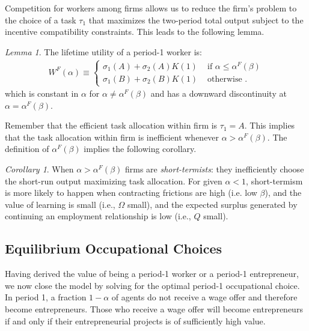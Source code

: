 \documentclass[12pt,american]{paper}
\theoremstyle{remark}
\newtheorem{lemma}{Lemma}
\newtheorem{cor}{Corollary}
\begin{document}
Competition for workers among firms allows us to reduce the firm's problem to the choice of a task $\tau_1$ that maximizes the two-period total output subject to the incentive compatibility constraints. This leads to the following lemma.
\begin{lemma}
The lifetime utility of a period-1 worker is:
\begin{align}\label{eq: value worker}
W^F(\alpha) \equiv
\begin{cases}
\sigma_1(A)+\sigma_2(A) K(1) &\text{ if } \alpha \leq \alpha^F(\beta)\\
\sigma_1(B)+\sigma_2(B) K(1) &\text{ otherwise }.
\end{cases}
\end{align}
which is constant in $\alpha$ for $\alpha \neq \alpha^F(\beta)$ and has a downward discontinuity at $\alpha=\alpha^F(\beta)$.
\end{lemma}

Remember that the efficient task allocation within firm is $\tau_1=A$. This implies that the task allocation within firm is inefficient whenever  $\alpha>\alpha^F(\beta)$. The definition of $\alpha^F(\beta)$ implies the following corollary.
\begin{cor}
When $\alpha > \alpha^F(\beta)$ firms are \textit{short-termists}: they inefficiently choose the short-run output maximizing task allocation. For given $\alpha<1$, short-termism is more likely  to happen when  contracting frictions are high (i.e. low $\beta$),   and the value of learning   is small (i.e., $\Omega$ small), and the expected surplus generated by continuing an employment relationship is low (i.e., $Q$ small). 
\end{cor}




\subsection{Equilibrium Occupational Choices}

Having derived the value of being a period-1 worker or a period-1 entrepreneur, we now close the model by solving for the optimal period-1 occupational choice. In period 1, a fraction  $1-\alpha$ of agents do not receive a wage offer and therefore become entrepreneurs. Those who receive a wage offer will become entrepreneurs if and only if their entrepreneurial projects is of sufficiently high value.
\end{document}
